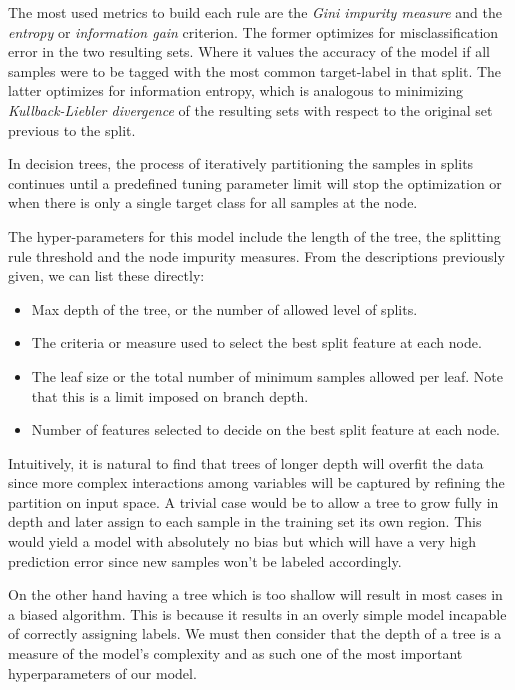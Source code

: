 
The most used metrics to build each rule are the \textit{Gini impurity measure} and the \textit{entropy} or \textit{information gain} criterion. The former optimizes for misclassification error in the two resulting sets. Where it values the accuracy of the model if all samples were to be tagged with the most common target-label in that split. The latter optimizes for information entropy, which is analogous to minimizing \textit{Kullback-Liebler divergence} of the resulting sets with respect to the original set previous to the split.

In decision trees, the process of iteratively partitioning the samples in splits continues until a predefined tuning parameter limit will stop the optimization or when there is only a single target class for all samples at the node.

The hyper-parameters for this model include the length of the tree,  the splitting rule threshold and the node impurity measures. From the descriptions previously given, we can list these directly:

\begin{itemize}
\item Max depth of the tree, or the number of allowed level of splits.
\item The criteria or measure used to select the best split feature at each node.
\item The leaf size or the total number of minimum samples allowed per leaf. Note that this is a limit imposed on  branch depth.
\item Number of features selected to decide on the best split feature at each node.
\end{itemize}


Intuitively, it is natural to find that trees of longer depth will overfit the data since more complex interactions among variables will be captured by refining the partition on input space. A trivial case would be to allow a tree to grow fully in depth and later assign to each sample in the training set its own region. This would yield a model with absolutely no bias but which will have a very high prediction error since new samples won't be labeled accordingly.

On the other hand having a tree which is too shallow will result in most cases in a biased algorithm.  This is because it results in an overly simple model incapable of correctly assigning labels.  We must then consider that the depth of a tree is a measure of the model's complexity and as such one of the most important hyperparameters of our model.

